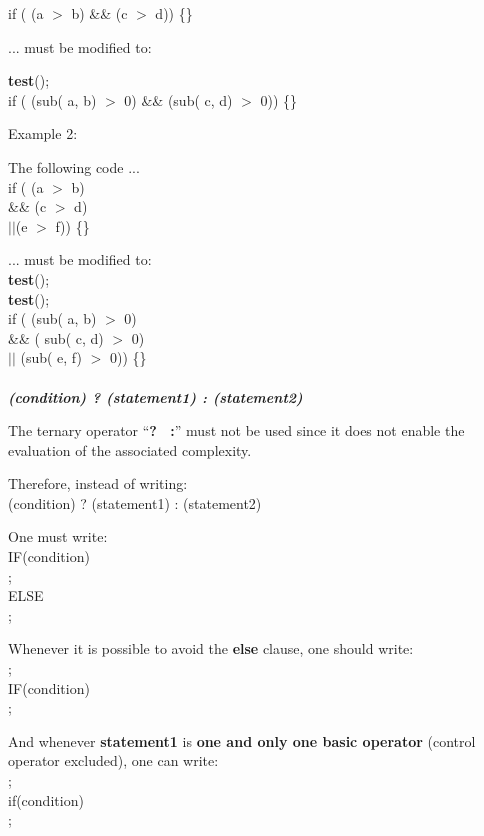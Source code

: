 if ( (a $>$ b) \&\& (c $>$ d)) \{\}

... must be modified to:

\textbf{test}(); \\
if ( (sub( a, b) $>$ 0) \&\& (sub( c, d) $>$ 0)) \{\}

Example 2:

The following code ...\\
if ( (a $>$ b) \\
\&\& (c $>$ d) \\
$||$(e $>$ f)) \{\}

... must be modified to:\\
\textbf{test}(); \\
\textbf{test}(); \\
if (  (sub( a, b) $>$ 0)\\
\&\& ( sub( c, d) $>$ 0)\\
$||$ (sub( e, f) $>$ 0)) \{\}\\

\ \\
\textbf{\emph{(condition) ? (statement1) : (statement2)}}

The ternary operator ``\textbf{? \ :}'' must not be used since it does
not enable the evaluation of the associated complexity. 

Therefore, instead of writing: \\
(condition) ? (statement1) : (statement2)

One must write: \\
IF(condition)\\
;\\
ELSE\\
;

Whenever it is possible to avoid the \textbf{else} clause, one should write:\\
;\\
IF(condition)\\
;

And whenever \textbf{statement1} is \textbf{one and only one basic
operator} (control operator excluded), one can write:\\
;\\
if(condition)\\
;\\

